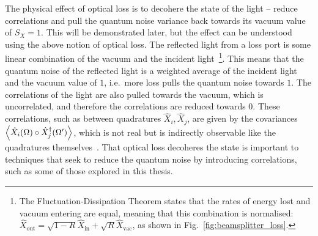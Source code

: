 The physical effect of optical loss is to decohere the state of the light -- reduce correlations and pull the quantum noise variance back towards its vacuum value of $S_X=1$. This will be demonstrated later, but the effect can be understood using the above notion of optical loss. The reflected light from a loss port is some linear combination of the vacuum and the incident light~\footnote{The Fluctuation-Dissipation Theorem states that the rates of energy lost and vacuum entering are equal, meaning that this combination is normalised: $\hat X_\text{out}=\sqrt{1-R}\hat X_\text{in}+\sqrt{R}\hat X_\text{vac}$, as shown in Fig.~\ref{fig:beamsplitter_loss}.}. This means that the quantum noise of the reflected light is a weighted average of the incident light and the vacuum value of $1$, i.e.\ more loss pulls the quantum noise towards $1$. The correlations of the light are also pulled towards the vacuum, which is uncorrelated, and therefore the correlations are reduced towards $0$. These correlations, such as between quadratures $\hat{X}_i, \hat{X}_j$, are given by the covariances $\ev{\hat{X}_i(\Omega)\circ\hat{X}_j^\dag(\Omega')}$, which is not real but is indirectly observable like the quadratures themselves~\cite{}. That optical loss decoheres the state is important to techniques that seek to reduce the quantum noise by introducing correlations, such as some of those explored in this thesis.


